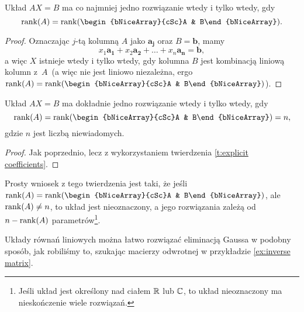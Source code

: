 \begin{theorem}
    \label{t:Kronecker-Cappelli}
    Układ $AX = B$ ma co najmniej jedno rozwiązanie wtedy i tylko wtedy, gdy
    \[ \rank(A) = \rank(\begin{bNiceArray}{cSc}A & B\end{bNiceArray}). \]
\end{theorem}
\begin{proof}
    Oznaczając $j$-tą kolumną $A$ jako $\mathbf{a_j}$ oraz $B = \mathbf{b}$, mamy
    \[ x_1\mathbf{a_1} + x_2\mathbf{a_2} + \ldots + x_n\mathbf{a_n} = \mathbf{b}, \]
    a więc $X$ istnieje wtedy i tylko wtedy, gdy kolumna $B$ jest kombinacją liniową kolumn z~$A$~(a więc nie jest liniowo niezależna, ergo $\rank(A) = \rank(\begin{bNiceArray}{cSc}A & B\end{bNiceArray})$).
\end{proof}

\begin{theorem}
    \label{t:rankA = rankA|B = n}
    Układ $AX = B$ ma dokładnie jedno rozwiązanie wtedy i tylko wtedy, gdy
    \[ \rank(A) = \rank(\begin{bNiceArray}{cSc}A & B\end{bNiceArray}) = n, \]
    gdzie $n$ jest liczbą niewiadomych.
\end{theorem}
\begin{proof}
    Jak poprzednio, lecz z wykorzystaniem twierdzenia \ref{t:explicit coefficients}.
\end{proof}

Prosty wniosek z tego twierdzenia jest taki, że jeśli $\rank(A) = \rank(\begin{bNiceArray}{cSc}A & B\end{bNiceArray})$, ale $\operatorname{rank}(A) \neq n$, to układ jest nieoznaczony, a jego rozwiązania zależą od $n - \operatorname{rank}(A)$ parametrów\footnote{Jeśli układ jest określony nad ciałem $\mathbb R$ lub $\mathbb C$, to układ nieoznaczony ma nieskończenie wiele rozwiązań.}.

Układy równań liniowych można łatwo rozwiązać eliminacją Gaussa w podobny sposób, jak robiliśmy to, szukając macierzy odwrotnej w przykładzie \ref{ex:inverse matrix}.

